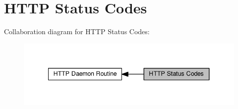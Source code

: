 \hypertarget{group__HTTP__Status}{}\section{H\+T\+TP Status Codes}
\label{group__HTTP__Status}
Collaboration diagram for H\+T\+TP Status Codes\+:
\nopagebreak
\begin{figure}[H]
\begin{center}
\leavevmode
\includegraphics[width=341pt]{group__HTTP__Status}
\end{center}
\end{figure}
